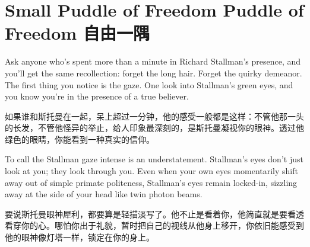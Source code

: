 \chapter{\ifdefined\eng
\ifdefined\vone 
Small Puddle of Freedom
\fi
\ifdefined\vtwo
Puddle of Freedom
\fi
\fi
\ifdefined\chs
自由一隅
\fi}

\ifdefined\eng
\ifdefined{}
\fi
\fi

\ifdefined\chs
\ifdefined{}
\fi
\fi

\ifdefined\eng
Ask anyone who's spent more than a minute in Richard Stallman's presence, and you'll get the same recollection: forget the long hair. Forget the quirky demeanor. The first thing you notice is the gaze. One look into Stallman's green eyes, and you know you're in the presence of a true believer.
\fi

\ifdefined\chs
如果谁和斯托曼在一起，呆上超过一分钟，他的感受一般都是这样：不管他那一头的长发，不管他怪异的举止，给人印象最深刻的，是斯托曼凝视你的眼神。透过他绿色的眼睛，你能看到一种真实的信仰。
\fi

\ifdefined\eng
To call the Stallman gaze intense is an understatement. Stallman's eyes don't just look at you; they look through you. Even when your own eyes momentarily shift away out of simple primate politeness, Stallman's eyes remain locked-in, sizzling away at the side of your head like twin photon beams.
\fi

\ifdefined\chs
要说斯托曼眼神犀利，都要算是轻描淡写了。他不止是看着你，他简直就是要看透看穿你的心。哪怕你出于礼貌，暂时把自己的视线从他身上移开，你依旧能感受到他的眼神像灯塔一样，锁定在你的身上。
\fi

